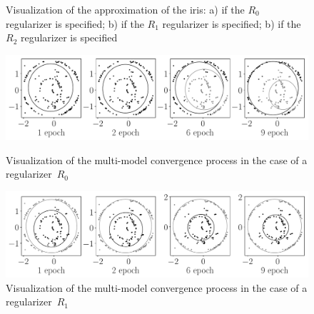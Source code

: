 \begin{figure}[h!]
\caption{Visualization of the approximation of the iris: a) if the $ R_0 $ regularizer is specified; b) if the $ R_1 $ regularizer is specified; b) if the $ R_2 $ regularizer is specified}
\label{ce:fig6}
\end{figure}


\begin{figure}
     \includegraphics[width=\textwidth]{figures/experiment_real_not_prior}\\
     \caption{Visualization of the multi-model convergence process in the case of a regularizer~$R_0$}
    \label{ce:fig7}
\end{figure}

\begin{figure}
     \includegraphics[width=\textwidth]{figures/experiment_real_prior}
     \caption{Visualization of the multi-model convergence process in the case of a regularizer~$R_1$}
    \label{ce:fig8}
\end{figure}

